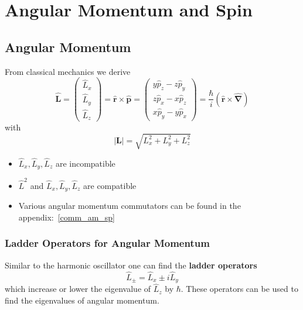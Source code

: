 \section{Angular Momentum and Spin}
\subsection{Angular Momentum}


From classical mechanics we derive
\begin{equation*}
    \widehat{\mathbf{L}}=
    \begin{pmatrix}
        \widehat{L}_x \\
        \widehat{L}_y \\
        \widehat{L}_z
    \end{pmatrix}
    =\widehat{\mathbf{r}}\times\widehat{\mathbf{p}}
    =
    \begin{pmatrix}
        y\widehat{p}_z-z\widehat{p}_y \\
        z\widehat{p}_x-x\widehat{p}_z \\
        x\widehat{p}_y-y\widehat{p}_x
    \end{pmatrix}
    =\frac{\hbar}{i}(\mathbf{\widehat{r}}\times\widehat{\mathbf{\nabla}})
\end{equation*}
with
\begin{equation*}
    |\mathbf{L}|=\sqrt{L_{x}^{2}+L_{y}^{2}+L_{z}^{2}}
\end{equation*}


\begin{itemize}
    \item $\widehat{L}_x, \widehat{L}_y, \widehat{L}_z$ are incompatible
    \item $\widehat{L}^2$ and $\widehat{L}_x, \widehat{L}_y, \widehat{L}_z$ are compatible
    \item Various angular momentum commutators can be found in the appendix:\ \ref{comm_am_sp}
\end{itemize}

\subsubsection{Ladder Operators for Angular Momentum}

Similar to the harmonic oscillator one can find the \textbf{ladder operators}
\begin{equation*}
    \widehat{L}_{\pm}=\widehat{L}_x\pm i \widehat{L}_y
\end{equation*}
which increase or lower the eigenvalue of $\widehat{L}_z$ by $\hbar$. These operators can be used to find the eigenvalues of angular momentum.

